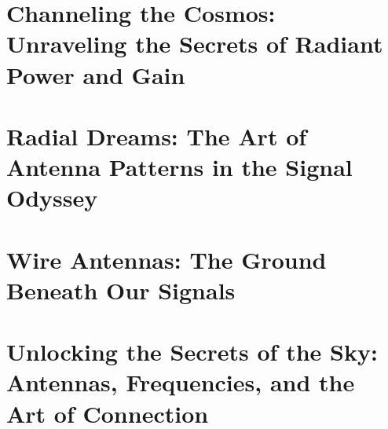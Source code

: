 \documentclass[12pt]{book}
\begin{document}
\section{Channeling the Cosmos: Unraveling the Secrets of Radiant Power and Gain}












\section{Radial Dreams: The Art of Antenna Patterns in the Signal Odyssey}











\section{Wire Antennas: The Ground Beneath Our Signals}














\section{Unlocking the Secrets of the Sky: Antennas, Frequencies, and the Art of Connection}












\end{document}
